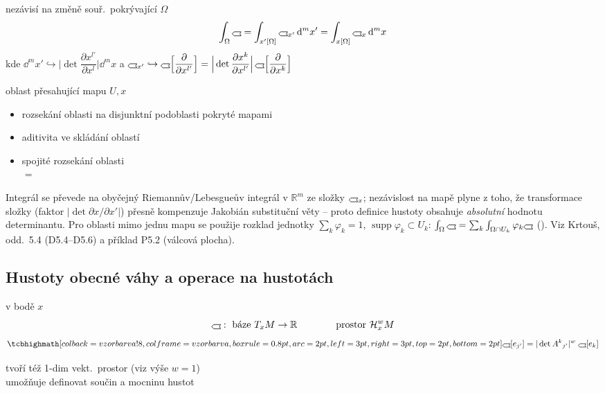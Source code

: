 nezávisí na změně souř.\ pokrývající $\Omega$
\[
  \int_\Omega \gmIhustsym = \int_{x'[\Omega]} \gmIhustsym_{x'}\,\dd^m x' = \int_{x[\Omega]} \gmIhustsym_x\,\dd^m x
\]
\quad kde \quad $\dd^m x' \hookrightarrow \Big|\det\dfrac{\partial x^{l'}}{\partial x^l}\Big|\dd^m x$
\quad a \quad $\gmIhustsym_{x'} \hookrightarrow \gmIhustsym\Big[\dfrac{\partial}{\partial x^{l'}}\Big] = \Big|\det\dfrac{\partial x^k}{\partial x^{l'}}\Big|\,\gmIhustsym\Big[\dfrac{\partial}{\partial x^k}\Big]$

oblast přesahující mapu $U,x$
\begin{itemize}[nosep]
  \item[--] rozsekání oblasti na disjunktní podoblasti pokryté mapami
  \item[--] aditivita ve skládání oblastí
  \item[--] spojité rozsekání oblasti \\
        $=$ 
\end{itemize}

\begin{vysvetleni}
Integrál se převede na obyčejný Riemannův/Lebesgueův integrál v $\mathbb{R}^m$ ze složky $\gmIhustsym_x$; nezávislost na mapě
plyne z toho, že transformace složky (faktor $|\det\partial x/\partial x'|$) přesně kompenzuje Jakobián substituční věty -- proto
definice hustoty obsahuje \emph{absolutní} hodnotu determinantu. Pro oblasti mimo jednu mapu se použije rozklad jednotky
$\sum_k\varphi_k = 1$, $\operatorname{supp}\varphi_k\subset U_k$: $\int_\Omega\gmIhustsym = \sum_k\int_{\Omega\cap U_k}\varphi_k\gmIhustsym$
(). Viz Krtouš, odd.~5.4 (D5.4--D5.6) a příklad P5.2 (válcová plocha).
\end{vysvetleni}

\subsection{Hustoty obecné váhy a operace na hustotách}

\begin{definice}
 v bodě $x$
\[
  \gmIhustsym:\ \text{báze } T_xM \to \mathbb{R} \qquad\qquad \text{prostor } \mathcal{H}^w_xM
\]
\[
  \vzorec{\gmIhustsym[e_{j'}] = |\det A^k{}_{j'}|^w\;\gmIhustsym[e_k]}
\]
\end{definice}
tvoří též 1-dim vekt.\ prostor (viz výše $w = 1$) \\
umožňuje definovat součin a mocninu hustot


